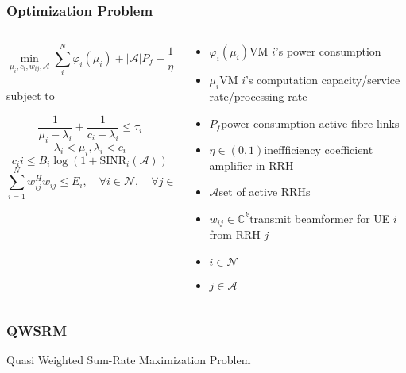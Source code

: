 \documentclass[usenames,dvipsnames]{beamer}
\begin{document}
\begin{frame}
  \frametitle{Optimization Problem}
  \vspace*{-2.5\baselineskip}
  \begin{columns}[t]
    \begin{column}{0.62\linewidth}
  \begin{exampleblock}{}
   \[
     \min_{\mu_{i},c_{i},w_{ij},\mathcal{A}}\sum_{i}^{N}\varphi_{i}(\mu_{i}) + \lvert\mathcal{A}\rvert P_{f} + \frac{1}{\eta}\sum_{i = 1}^{N}\sum_{j\in{A}}w_{ij}^{H}w_{ij}
   \]
  \end{exampleblock}
  subject to
  \begin{exampleblock}{}
    \[
      \frac{1}{\mu_{i}- \lambda_{i}} + \frac{1}{c_{i} - \lambda_{i}}\leq\tau_{i}
    \]
    \[
      \lambda_{i} < \mu_{i},\lambda_{i}<c_{i}
  \]
  \[
    c_i{i} \leq B_{i}\log(1+\text{SINR}_{i}(\mathcal{A}))
  \]
  \[
    \sum_{i=1}^{N}w_{ij}^{H}w_{ij}\leq E_{i},\quad \forall i\in \mathcal{N}, \quad \forall j\in \mathcal{L}
  \]
  \end{exampleblock}
\end{column}
\begin{column}{0.38\linewidth}
  \footnotesize\raggedright
  \begin{itemize}
    \item $\varphi_{i}(\mu_{i})$\quad VM $i$'s power consumption
    \item $\mu_{i}$\qquad VM $i$'s computation capacity/service rate/processing rate
    \item $P_{f}$\qquad power consumption active fibre links
    \item $\eta\in(0,1)$\quad ineffficiency coefficient amplifier in RRH
    \item $\mathcal{A}$\qquad set of active RRHs
    \item $w_{ij}\in\mathbb{C}^{k}$\quad transmit beamformer for UE $i$ from RRH $j$
    \item $i\in\mathcal{N}$
    \item $j\in\mathcal{A}$
  \end{itemize}
\end{column}
\end{columns}
\end{frame}
\begin{frame}
  \frametitle{QWSRM}
  \begin{exampleblock}{\phantom{Tp}}
    \centering Quasi Weighted Sum-Rate Maximization Problem
  \end{exampleblock}
\end{frame}
\end{document}
